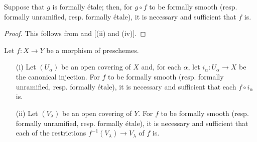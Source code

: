 \begin{corollary}[17.1.5]
\label{IV.17.1.5}
Suppose that $g$ is formally \'etale;
then, for $g\circ f$ to be formally smooth (resp. formally unramified, resp. formally \'etale), it is necessary and sufficient that $f$ is.
\end{corollary}

\begin{proof}
This follows from  and [(ii) and (iv)].
\end{proof}

\begin{proposition}[17.1.6]
\label{IV.17.1.6}
Let $f:X\to Y$ be a morphism of preschemes.
\begin{enumerate}
  \item[{\rm(i)}] Let $(U_\alpha)$ be an open covering of $X$ and, for each $\alpha$, let $i_\alpha:U_\alpha\to X$ be the canonical injection.
    For $f$ to be formally smooth (resp. formally unramified, resp. formally \'etale), it is necessary and sufficient that each $f\circ i_\alpha$ is.
  \item[{\rm(ii)}] Let $(V_\lambda)$ be an open covering of $Y$.
    For $f$ to be formally smooth (resp. formally unramified, resp. formally \'etale), it is necessary and sufficient that each of the restrictions $f^{-1}(V_\lambda)\to V_\lambda$ of $f$ is.
\end{enumerate}
\end{proposition}

